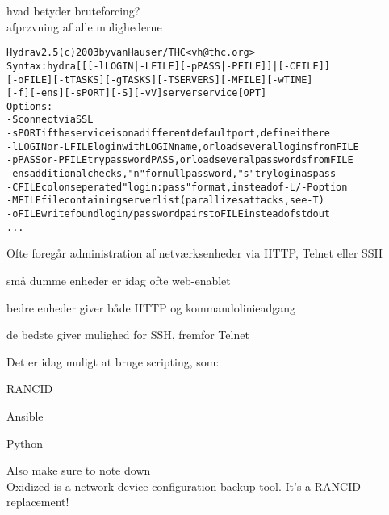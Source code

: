 \documentclass[Screen16to9,17pt]{foils}
\begin{document}

\begin{list1}
\item hvad betyder bruteforcing?\\
afprøvning af alle mulighederne
\end{list1}

\begin{alltt}
\small
Hydra v2.5 (c) 2003 by van Hauser / THC <vh@thc.org>
Syntax: hydra [[[-l LOGIN|-L FILE] [-p PASS|-P FILE]] | [-C FILE]]
[-o FILE] [-t TASKS] [-g TASKS] [-T SERVERS] [-M FILE] [-w TIME]
[-f] [-e ns] [-s PORT] [-S] [-vV] server service [OPT]
Options:
  -S        connect via SSL
  -s PORT   if the service is on a different default port, define it here
  -l LOGIN  or -L FILE login with LOGIN name, or load several logins from FILE
  -p PASS   or -P FILE try password PASS, or load several passwords from FILE
  -e ns     additional checks, "n" for null password, "s" try login as pass
  -C FILE   colon seperated "login:pass" format, instead of -L/-P option
  -M FILE   file containing server list (parallizes attacks, see -T)
  -o FILE   write found login/password pairs to FILE instead of stdout
...
\end{alltt}



\begin{list1}
\item Ofte foregår administration af netværksenheder via HTTP, Telnet eller SSH
\begin{list2}
\item små dumme enheder er idag ofte web-enablet
\item bedre enheder giver både HTTP og kommandolinieadgang
\item de bedste giver mulighed for SSH, fremfor Telnet
\end{list2}
\item Det er idag muligt at bruge scripting, som:
\begin{list2}
\item RANCID 
\item Ansible 
\item Python
\item Also make sure to note down \\
Oxidized is a network device configuration backup tool. It's a RANCID replacement!
\end{list2}
\end{list1}
\end{document}
